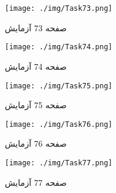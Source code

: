{    %
    \begin{figure}[htpb]
        \centering
        \texttt{[image: ./img/Task73.png]}
        \caption{ صفحه 73 آزمایش }
        \label{fig:Task73}
    \end{figure}


    \begin{figure}[htpb]
        \centering
        \texttt{[image: ./img/Task74.png]}
        \caption{ صفحه 74 آزمایش }
        \label{fig:Task74}
    \end{figure}


    \begin{figure}[htpb]
        \centering
        \texttt{[image: ./img/Task75.png]}
        \caption{ صفحه 75 آزمایش }
        \label{fig:Task75}
    \end{figure}


    \begin{figure}[htpb]
        \centering
        \texttt{[image: ./img/Task76.png]}
        \caption{ صفحه 76 آزمایش }
        \label{fig:Task76}
    \end{figure}


    \begin{figure}[htpb]
        \centering
        \texttt{[image: ./img/Task77.png]}
        \caption{ صفحه 77 آزمایش }
        \label{fig:Task77}
    \end{figure}


}
